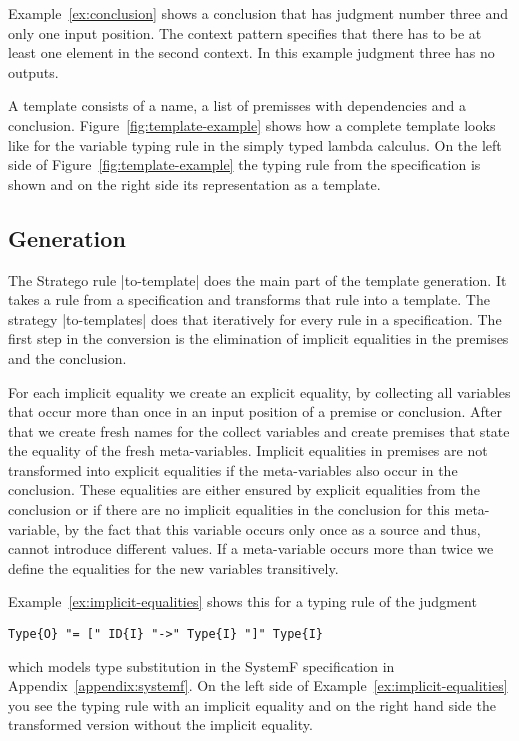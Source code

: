 Example~\ref{ex:conclusion} shows a conclusion that has judgment
number three and only one input position. The context pattern specifies
that there has to be at least one element in the second context. In
this example judgment three has no outputs.

A template consists of a name, a list of premisses with dependencies
and a conclusion. Figure~\ref{fig:template-example} shows how a
complete template looks like for the variable typing rule in the
simply typed lambda calculus. On the left side of
Figure~\ref{fig:template-example} the typing rule from the
specification is shown and on the right side its representation as a
template.

\subsection{Generation}
The Stratego rule \code|to-template| does the main part of the
template generation. It takes a rule from a specification and
transforms that rule into a template. The strategy \code|to-templates|
does that iteratively for every rule in a specification. The first
step in the conversion is the elimination of implicit equalities in
the premises and the conclusion.

For each implicit equality we create an explicit equality, by
collecting all variables that occur more than once in an input
position of a premise or conclusion. After that we create fresh names
for the collect variables and create premises that state the equality
of the fresh meta-variables. Implicit equalities in premises are not
transformed into explicit equalities if the meta-variables also occur
in the conclusion. These equalities are either ensured by explicit
equalities from the conclusion or if there are no implicit equalities
in the conclusion for this meta-variable, by the fact that this
variable occurs only once as a source and thus, cannot introduce
different values. If a meta-variable occurs more than twice we define
the equalities for the new variables transitively.

Example~\ref{ex:implicit-equalities} shows this for a typing rule of
the judgment

\begin{lstlisting}[language=sltc]
Type{O} "= [" ID{I} "->" Type{I} "]" Type{I}
\end{lstlisting}

which models type substitution in the SystemF specification in
Appendix~\ref{appendix:systemf}. On the left side of
Example~\ref{ex:implicit-equalities} you see the typing rule with an
implicit equality and on the right hand side the transformed version
without the implicit equality.

